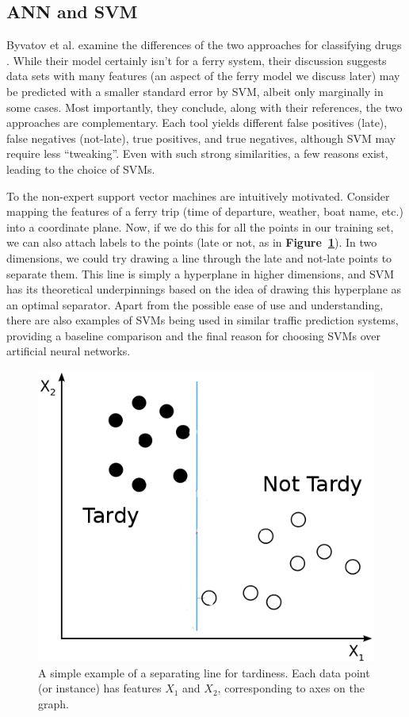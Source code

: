 \documentclass[11pt]{article} %
\begin{document}
\subsection{ANN and SVM}
\label{sec:ann_svm}
Byvatov et al. examine the differences of the two approaches for classifying drugs
\cite{byvatov2003comparison}. While their model certainly isn't for a ferry 
system, their discussion suggests data sets with many features (an aspect of the 
ferry model we discuss later) may be predicted with a smaller standard error by
SVM, albeit only marginally in some cases. Most importantly, they conclude,
along with their references, the two approaches are complementary. Each 
tool yields different false positives (late), false negatives (not-late), true
positives, and true negatives, although SVM may require less ``tweaking''. Even
with such strong similarities, a few reasons exist, leading to the choice of SVMs.

To the non-expert support vector machines are intuitively motivated. Consider 
mapping the
features of a ferry trip (time of departure, weather, boat name, etc.) into a
coordinate plane.  Now, if we do this for all the points in our training set,
we can also attach labels to the points (late or not, as in 
\textbf{Figure~\ref{fig:basic_svm_data}}). In two dimensions, we
could try drawing a line through the late and not-late points to separate them.
This line is simply a hyperplane in higher dimensions, and SVM has its theoretical
underpinnings based on the idea of drawing this hyperplane as an optimal separator. 
Apart from the possible ease of use and understanding, there are also examples of 
SVMs being used in similar traffic prediction systems, providing a baseline 
comparison and the final reason for choosing SVMs over artificial neural networks.

\begin{figure}[h]
  \centering
  \includegraphics[scale=.5]{images/basic_svm_data.png}
  \caption{A simple example of a separating line for tardiness. 
      Each data point (or instance) has features $X_1$ and $X_2$, corresponding
      to axes on the graph.}
  \label{fig:basic_svm_data}
\end{figure}
\end{document}
